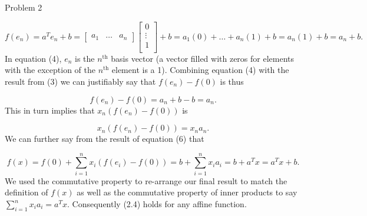 \begin{problem}{Problem 2}
\begin{highlight}[Solution]
        \begin{equation}
            f(e_{n}) = a^{T}e_{n} + b = 
            \begin{bmatrix}
                a_{1} & \dots & a_{n}
            \end{bmatrix}
            \begin{bmatrix}
                0 \\
                \vdots \\
                1 \\
            \end{bmatrix}
            + b = a_{1}(0) + \dots + a_{n}(1) + b = a_{n}(1) + b = a_{n} + b.
        \end{equation}
        In equation (4), $e_{n}$ is the $n^{\text{th}}$ basis vector (a vector filled with zeros for elements with the exception of the $n^{\text{th}}$ element is a 1). Combining equation (4) with the 
        result from (3) we can justifiably say that $f(e_{n}) - f(0)$ is thus

        \begin{equation}
            f(e_{n}) - f(0) = a_{n} + b - b = a_{n}.
        \end{equation}
        This in turn implies that $x_{n}(f(e_{n}) - f(0))$ is

        \begin{equation}
            x_{n}(f(e_{n}) - f(0)) = x_{n}a_{n}.
        \end{equation}
        We can further say from the result of equation (6) that

        \begin{equation}
            f(x) = f(0) + \sum^{n}_{i = 1} x_{i}(f(e_{i}) - f(0)) = b + \sum^{n}_{i = 1} x_{i}a_{i} = b + a^{T}x = a^{T}x + b.
        \end{equation}
        We used the commutative property to re-arrange our final result to match the definition of $f(x)$ as well as the commutative property of inner products to say $\sum^{n}_{i=1}x_{i}a_{i} = a^{T}x$.
        Consequently (2.4) holds for any affine function.
    \end{highlight}
\end{problem}

